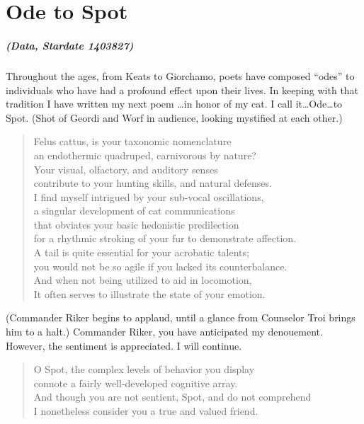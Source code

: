 \chapter{Ode to Spot}
\OnePageChapter         %

\noindent\paragraph{(Data, Stardate 1403827)}
Throughout the ages, from Keats to Giorchamo, poets have
composed ``odes'' to individuals who have had a profound effect
upon their lives.  In keeping with that tradition
I have written my next poem \ldots in honor of my cat.
I call it\ldots{}Ode\ldots{}to Spot.
(Shot of Geordi and Worf in audience,
looking mystified at each other.)

\begin{quotation}
\noindent Felus cattus, is your taxonomic nomenclature \\
an endothermic quadruped, carnivorous by nature? \\
Your visual, olfactory, and auditory senses \\
contribute to your hunting skills, and natural defenses. \\
I find myself intrigued by your sub-vocal oscillations, \\
a singular development of cat communications \\
that obviates your basic hedonistic predilection \\
for a rhythmic stroking of your fur to demonstrate affection. \\
A tail is quite essential for your acrobatic talents; \\
you would not be so agile if you lacked its counterbalance. \\
And when not being utilized to aid in locomotion, \\
It often serves to illustrate the state of your emotion.
\end{quotation}


\noindent(Commander Riker begins to applaud, until a
glance from Counselor Troi brings him to a halt.)
Commander Riker, you have anticipated my denouement.
However, the sentiment is appreciated.  I will continue.


\begin{quotation}
\noindent O Spot, the complex levels of behavior you display \\
connote a fairly well-developed cognitive array. \\
And though you are not sentient, Spot, and do not comprehend \\
I nonetheless consider you a true and valued friend.
\end{quotation}
